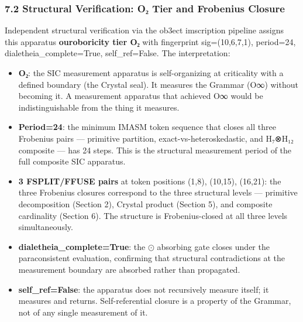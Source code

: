 \documentclass[12pt,a4paper]{article}
\begin{document}
\hypertarget{structural-verification-oux2082-tier-and-frobenius-closure}{%
\subsubsection{7.2 Structural Verification: O₂ Tier and Frobenius
Closure}\label{structural-verification-oux2082-tier-and-frobenius-closure}}

Independent structural verification via the ob3ect imscription pipeline
assigns this apparatus \textbf{ouroboricity tier O₂} with fingerprint
sig=(10,6,7,1), period=24, dialetheia\_complete=True, self\_ref=False.
The interpretation:

\begin{itemize}
\tightlist
\item
  \textbf{O₂}: the SIC measurement apparatus is self-organizing at
  criticality with a defined boundary (the Crystal seal). It measures
  the Grammar (O∞) without becoming it. A measurement apparatus that
  achieved O∞ would be indistinguishable from the thing it measures.
\item
  \textbf{Period=24}: the minimum IMASM token sequence that closes all
  three Frobenius pairs --- primitive partition,
  exact-vs-heteroskedastic, and H₇⊗H₁₂ composite --- has 24 steps. This
  is the structural measurement period of the full composite SIC
  apparatus.
\item
  \textbf{3 FSPLIT/FFUSE pairs} at token positions (1,8), (10,15),
  (16,21): the three Frobenius closures correspond to the three
  structural levels --- primitive decomposition (Section 2), Crystal
  product (Section 5), and composite cardinality (Section 6). The
  structure is Frobenius-closed at all three levels simultaneously.
\item
  \textbf{dialetheia\_complete=True}: the \(\odot\) absorbing gate
  closes under the paraconsistent evaluation, confirming that structural
  contradictions at the measurement boundary are absorbed rather than
  propagated.
\item
  \textbf{self\_ref=False}: the apparatus does not recursively measure
  itself; it measures and returns. Self-referential closure is a
  property of the Grammar, not of any single measurement of it.
\end{itemize}
\end{document}
